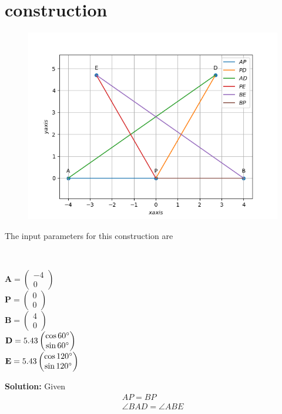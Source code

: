 \documentclass[10pt]{article}
\newcommand{\solution}{\noindent \textbf{Solution: }}
\newcommand{\myvec}[1]{\ensuremath{\begin{pmatrix}#1\end{pmatrix}}}
\let\vec\mathbf{}
\begin{document}
\section{construction}
\begin{figure}[h!]
	\begin{center}
		\includegraphics[width=5in]{./figs/fig.png}
	\end{center}
\caption{}
\label{fig:Fig1}
\end{figure}
The input parameters for this construction are\\
\begin{table}[h!]
	\centering
 	
\caption{}
\label{table}
\end{table}\\
\begin{center}
$\vec{A}=\myvec{-4\\0}$\\
$\vec{P}=\myvec{0\\0}$\\
$\vec{B}=\myvec{4\\0}$\\
$\vec{D}=5.43\myvec{\cos60\degree\\\sin60\degree}$\\
$\vec{E}=5.43\myvec{\cos120\degree\\\sin120\degree}$\\
\end{center}
\solution
Given\\
\begin{align}
AP = BP
\label{eq:1}\\
\angle BAD = \angle ABE
\label{eq:2}
\end{align}
\end{document}
